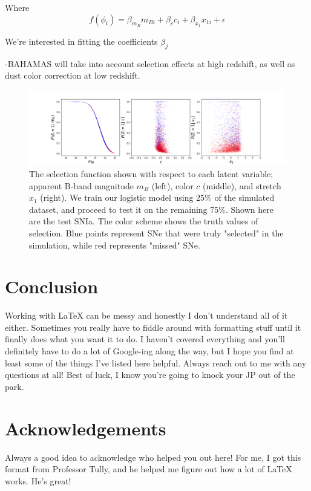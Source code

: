 \documentclass[12pt]{article}
\begin{document}
Where 
\begin{equation}\label{fofphi}
    f(\phi_i) = \beta_{m_B}m_{Bi} + \beta_{c}c_i + \beta_{x_1}x_{1i} + \epsilon 
\end{equation}

We're interested in fitting the coefficients $\beta_j$ 


-BAHAMAS will take into account selection effects at high redshift, as well as dust color correction at low redshift.



\begin{figure}[h!]
\centering
\includegraphics[width=\textwidth]{selection_fn.png}
\caption{The selection function shown with respect to each latent variable; apparent B-band magnitude $m_B$ (left), color $c$ (middle), and stretch $x_1$ (right). We train our logistic model using 25\% of the simulated dataset, and proceed to test it on the remaining 75\%. Shown here are the test SNIa. The color scheme shows the truth values of selection. Blue points represent SNe that were truly "selected" in the simulation, while red represents "missed" SNe.}
\label{selectionfn}
\end{figure}


\section{Conclusion}

Working with LaTeX can be messy and honestly I don't understand all of it either. Sometimes you really have to fiddle around with formatting stuff until it finally does what you want it to do. I haven't covered everything and you'll definitely have to do a lot of Google-ing along the way, but I hope you find at least some of the things I've listed here helpful. Always reach out to me with any questions at all! Best of luck, I know you're going to knock your JP out of the park. 



\clearpage
{}



\newpage
\section*{Acknowledgements}

Always a good idea to acknowledge who helped you out here! For me, I got this format from Professor Tully, and he helped me figure out how a lot of LaTeX works. He's great!
 
\end{document}

